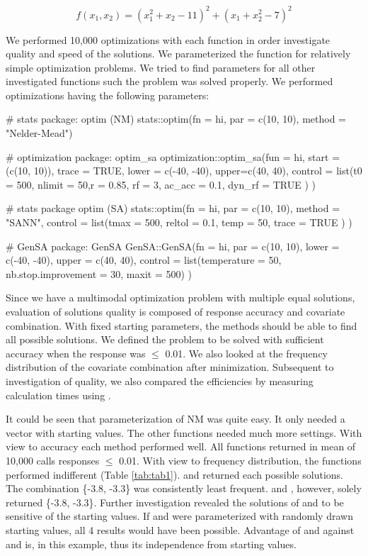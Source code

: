\begin{equation}
\label{eq:eq1}
f(x_1,x_2)=(x_1^2+x_2-11)^2+(x_1+x_2^2-7)^2
\end{equation}

We performed 10,000 optimizations with each function in order investigate quality and speed of the solutions. We parameterized the  function for relatively simple optimization problems. We tried to find parameters for all other investigated functions such the problem was solved properly. We performed optimizations having the following parameters:

\begin{example}
# stats package: optim (NM)
stats::optim(fn = hi, par = c(10, 10), method = "Nelder-Mead")
	
# optimization package: optim_sa
optimization::optim_sa(fun = hi, start = (c(10, 10)), trace = TRUE, 
	lower = c(-40, -40), upper=c(40, 40),
		control = list(t0 = 500, nlimit = 50,r = 0.85,
		rf = 3, ac_acc = 0.1, dyn_rf = TRUE
		)
	)

# stats package optim (SA)
stats::optim(fn = hi, par = c(10, 10), method = "SANN",
	control = list(tmax = 500, reltol = 0.1, temp = 50, trace = TRUE
		)
	)

# GenSA package: GenSA
GenSA::GenSA(fn = hi, par = c(10, 10), lower = c(-40, -40), upper = c(40, 40), 
	control = list(temperature = 50, nb.stop.improvement = 30, maxit = 500)
	)
\end{example}
Since we have a multimodal optimization problem with multiple equal solutions, evaluation of solutions quality is composed of response accuracy and covariate combination. With fixed starting parameters, the methods should be able to find all possible solutions. We defined the problem to be solved with sufficient accuracy when the response was $\leq$ 0.01. We also looked at the frequency distribution of the covariate combination after minimization. Subsequent to investigation of quality, we also compared the efficiencies by measuring calculation times using .

It could be seen that parameterization of NM was quite easy. It only needed a vector with starting values. The other functions needed much more settings. With view to accuracy each method performed well. All functions returned in mean of 10,000 calls responses $\leq$ 0.01. With view to frequency distribution, the functions performed indifferent (Table \ref{tab:tab1}).  and  returned each possible solutions.  The combination \{-3.8, -3.3\} was consistently least frequent.  and , however, solely returned \{-3.8, -3.3\}. Further investigation revealed the solutions of  and  to be sensitive of the starting values. If  and  were parameterized with randomly drawn starting values, all 4 results would have been possible. Advantage of  and  against  and  is, in this example, thus its independence from starting values.

